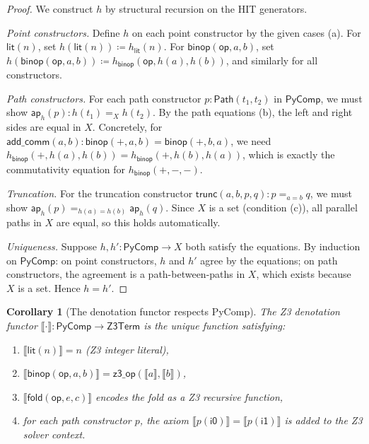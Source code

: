 \documentclass[11pt,a4paper]{report}
\theoremstyle{definition}
\theoremstyle{plain}
\newtheorem{corollary}[definition]{Corollary}
\newcommand{\den}[1]{\llbracket #1 \rrbracket}
\newcommand{\Path}{\mathsf{Path}}
\newcommand{\fold}{\mathsf{fold}}
\begin{document}
\begin{proof}
We construct $h$ by structural recursion on the HIT generators.

\emph{Point constructors.}  Define $h$ on each point constructor by
the given cases (a).  For $\mathsf{lit}(n)$, set $h(\mathsf{lit}(n))
\coloneqq h_{\mathsf{lit}}(n)$.  For $\mathsf{binop}(\mathsf{op}, a, b)$,
set $h(\mathsf{binop}(\mathsf{op}, a, b)) \coloneqq
h_{\mathsf{binop}}(\mathsf{op}, h(a), h(b))$, and similarly for all
constructors.

\emph{Path constructors.}  For each path constructor
$p : \Path(t_1, t_2)$ in $\mathsf{PyComp}$, we must show
$\mathsf{ap}_h(p) : h(t_1) =_X h(t_2)$.  By the path equations (b),
the left and right sides are equal in $X$.  Concretely, for
$\mathsf{add\_comm}(a, b) : \mathsf{binop}(+, a, b) = \mathsf{binop}(+, b, a)$,
we need $h_{\mathsf{binop}}(+, h(a), h(b)) = h_{\mathsf{binop}}(+, h(b), h(a))$,
which is exactly the commutativity equation for $h_{\mathsf{binop}}(+, -, -)$.

\emph{Truncation.}  For the truncation constructor
$\mathsf{trunc}(a, b, p, q) : p =_{a = b} q$, we must show
$\mathsf{ap}_h(p) =_{h(a) = h(b)} \mathsf{ap}_h(q)$.  Since $X$ is
a set (condition (c)), all parallel paths in $X$ are equal, so this
holds automatically.

\emph{Uniqueness.}  Suppose $h, h' : \mathsf{PyComp} \to X$ both satisfy
the equations.  By induction on $\mathsf{PyComp}$: on point constructors,
$h$ and $h'$ agree by the equations; on path constructors, the
agreement is a path-between-paths in $X$, which exists because $X$ is
a set.  Hence $h = h'$.
\end{proof}

\begin{corollary}[The denotation functor respects PyComp]
\label{cor:den-pycomp}
The Z3 denotation functor $\den{\cdot} : \mathsf{PyComp} \to
\mathsf{Z3Term}$ is the unique function satisfying:
\begin{enumerate}[label=(\roman*)]
  \item $\den{\mathsf{lit}(n)} = n$ \quad (Z3 integer literal),
  \item $\den{\mathsf{binop}(\mathsf{op}, a, b)} =
    \mathsf{z3\_op}(\den{a}, \den{b})$,
  \item $\den{\fold(\mathsf{op}, e, c)}$ encodes the fold as a Z3
    recursive function,
  \item for each path constructor $p$, the axiom
    $\den{p(\mathsf{i0})} = \den{p(\mathsf{i1})}$ is added to
    the Z3 solver context.
\end{enumerate}
\end{corollary}
\end{document}
